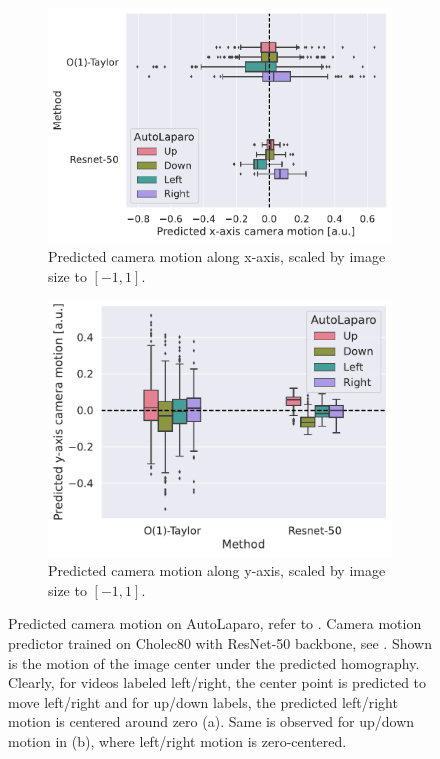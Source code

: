 \begin{figure}[htb]
\centering
\begin{subfigure}[b]{0.49\textwidth}
    \centering
    \includegraphics[width=\textwidth]{fig/23_03_07_autolaparo_cholec80_resnet50_duv_center_x.pdf}
    \caption{Predicted camera motion along x-axis, scaled by image size to $[-1, 1]$.}
    \label{c4:fig:autolaparo_results_a}
\end{subfigure}
\begin{subfigure}[b]{0.49\textwidth}
    \centering
    \includegraphics[width=\textwidth]{fig/23_03_07_autolaparo_cholec80_resnet50_duv_center_y.pdf}
    \caption{Predicted camera motion along y-axis, scaled by image size to $[-1, 1]$.}
    \label{c4:fig:autolaparo_results_b}
\end{subfigure}
\caption{Predicted camera motion on AutoLaparo, refer to . Camera motion predictor trained on Cholec80 with ResNet-50 backbone, see . Shown is the motion of the image center under the predicted homography. Clearly, for videos labeled left/right, the center point is predicted to move left/right and for up/down labels, the predicted left/right motion is centered around zero (a). Same is observed for up/down motion in (b), where left/right motion is zero-centered.}
\label{c4:fig:autolapato_results}
\end{figure}

